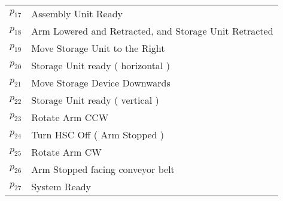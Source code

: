 \begin{table}[htbp]
\begin{tabular}{M{5cm}M{10cm}}
\hyperlink{partialNet:p17}{\hypertarget{partialTable:p17}{$p_{17}$}} & Assembly Unit Ready\\
\hyperlink{partialNet:p18}{\hypertarget{partialTable:p18}{$p_{18}$}} & Arm Lowered and Retracted, and Storage Unit Retracted\\
\hyperlink{partialNet:p19}{\hypertarget{partialTable:p19}{$p_{19}$}} & Move Storage Unit to the Right\\
\hyperlink{partialNet:p20}{\hypertarget{partialTable:p20}{$p_{20}$}} & Storage Unit ready ( horizontal )\\
\hyperlink{partialNet:p21}{\hypertarget{partialTable:p21}{$p_{21}$}} & Move Storage Device Downwards\\
\hyperlink{partialNet:p22}{\hypertarget{partialTable:p22}{$p_{22}$}} & Storage Unit ready ( vertical )\\
\hyperlink{partialNet:p23}{\hypertarget{partialTable:p23}{$p_{23}$}} & Rotate Arm CCW\\
\hyperlink{partialNet:p24}{\hypertarget{partialTable:p24}{$p_{24}$}} & Turn HSC Off ( Arm Stopped )\\
\hyperlink{partialNet:p25}{\hypertarget{partialTable:p25}{$p_{25}$}} & Rotate Arm CW\\
\hyperlink{partialNet:p26}{\hypertarget{partialTable:p26}{$p_{26}$}} & Arm Stopped facing conveyor belt\\
\hyperlink{partialNet:p27}{\hypertarget{partialTable:p27}{$p_{27}$}} & System Ready\\
\end{tabular}
\end{table}
